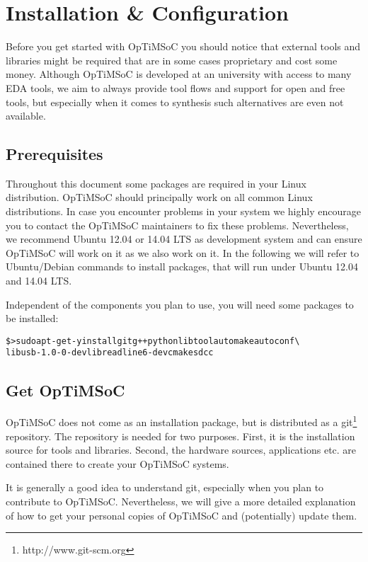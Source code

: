 \chapter{Installation \& Configuration}
\label{chap:installation}

Before you get started with OpTiMSoC you should notice that external
tools and libraries might be required that are in some cases
proprietary and cost some money. Although OpTiMSoC is developed at an
university with access to many EDA tools, we aim to always provide
tool flows and support for open and free tools, but especially when it
comes to synthesis such alternatives are even not available.

\section{Prerequisites}

Throughout this document some packages are required in your Linux
distribution. OpTiMSoC should principally work on all common Linux
distributions. In case you encounter problems in your system we highly
encourage you to contact the OpTiMSoC maintainers to fix these
problems. Nevertheless, we recommend Ubuntu 12.04 or 14.04 LTS as
development system and can ensure OpTiMSoC will work on it as we also
work on it. In the following we will refer to Ubuntu/Debian commands
to install packages, that will run under Ubuntu 12.04 and 14.04 LTS.

Independent of the components you plan to use, you will need some
packages to be installed:

\begin{alltt}
\$> sudo apt-get -y install git g++ python libtool automake autoconf \textbackslash
   libusb-1.0-0-dev libreadline6-dev cmake sdcc
\end{alltt}

\section{Get OpTiMSoC}

OpTiMSoC does not come as an installation package, but is distributed
as a git\footnote{http://www.git-scm.org} repository. The repository
is needed for two purposes. First, it is the installation source for
tools and libraries. Second, the hardware sources, applications
etc. are contained there to create your OpTiMSoC systems.

It is generally a good idea to understand git, especially when you
plan to contribute to OpTiMSoC. Nevertheless, we will give a more
detailed explanation of how to get your personal copies of OpTiMSoC
and (potentially) update them.

